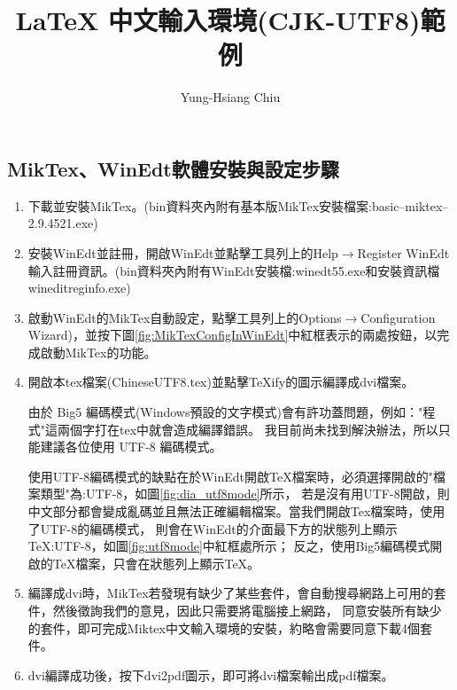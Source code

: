 \documentclass[12pt]{article}
\begin{document}
\begin{CJK*}{UTF8}{bsmi}


\renewcommand{\tablename}{表}
\renewcommand{\figurename}{圖}
\renewcommand{\refname}{參考文獻}

\title{\LaTeX{} 中文輸入環境(CJK-UTF8)範例}
\author{Yung-Hsiang Chiu}
\maketitle

\section{MikTex、WinEdt軟體安裝與設定步驟}















\begin{enumerate}
\item 下載並安裝MikTex。(bin資料夾內附有基本版MikTex安裝檔案:basic--miktex--2.9.4521.exe)
\item 安裝WinEdt並註冊，開啟WinEdt並點擊工具列上的Help$\rightarrow$Register WinEdt輸入註冊資訊。(bin資料夾內附有WinEdt安裝檔:winedt55.exe和安裝資訊檔 wineditreginfo.exe)
\item 啟動WinEdt的MikTex自動設定，點擊工具列上的Options$\rightarrow$Configuration Wizard)，並按下圖\ref{fig:MikTexConfigInWinEdt}中紅框表示的兩處按鈕，以完成啟動MikTex的功能。
\item 開啟本tex檔案(ChineseUTF8.tex)並點擊TeXify的圖示編譯成dvi檔案。

由於 Big5 編碼模式(Windows預設的文字模式)會有許功蓋問題，例如："程式"這兩個字打在tex中就會造成編譯錯誤。
我目前尚未找到解決辦法，所以只能建議各位使用 UTF-8 編碼模式。

使用UTF-8編碼模式的缺點在於WinEdt開啟TeX檔案時，必須選擇開啟的"檔案類型"為:UTF-8，如圖\ref{fig:dia_utf8mode}所示，
若是沒有用UTF-8開啟，則中文部分都會變成亂碼並且無法正確編輯檔案。當我們開啟Tex檔案時，使用了UTF-8的編碼模式，
則會在WinEdt的介面最下方的狀態列上顯示TeX:UTF-8，如圖\ref{fig:utf8mode}中紅框處所示；
反之，使用Big5編碼模式開啟的TeX檔案，只會在狀態列上顯示TeX。

\item 編譯成dvi時，MikTex若發現有缺少了某些套件，會自動搜尋網路上可用的套件，然後徵詢我們的意見，因此只需要將電腦接上網路，
    同意安裝所有缺少的套件，即可完成Miktex中文輸入環境的安裝，約略會需要同意下載4個套件。
\item dvi編譯成功後，按下dvi2pdf圖示，即可將dvi檔案輸出成pdf檔案。
\end{enumerate}



\end{CJK*} %
\end{document}
